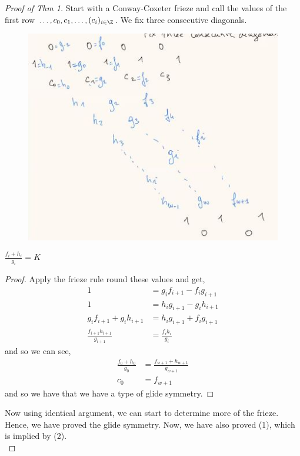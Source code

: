 \documentclass{article}
\begin{document}
\begin{proof}[Proof of Thm 1]
  Start with a Conway-Coxeter frieze and call the values of the first row $\dots, c_0, c_1, \dots, (c_i)_{i\in\Z}$. We fix three consecutive diagonals.
  \begin{figure}[!ht]
    \centering
    \includegraphics{./figures/L2.5}
  \end{figure}
  \newpage
  \begin{lemma}
    $\frac{f_i + h_i}{g_i} = K$
  \end{lemma}
  \begin{proof}
    Apply the frieze rule round these values and get,
    \begin{align*}
      1 &= g_i f_{i+1} - f_ig_{i+1}\\
      1  &= h_ig_{i+1} - g_ih_{i+1}\\
        g_if_{i+1} + g_ih_{i+1} &= h_ig_{i+1} + f_{i}g_{i+1}\\
        \frac{f_{i+1}h_{i+1}}{g_{i+1}} &= \frac{f_{i}h_{i}}{g_{i}}
    \end{align*}
    and so we can see,
    \begin{align*}
      \frac{f_0+h_0}{g_0} &= \frac{f_{w+1} + h_{w+1}}{g_{w+1}}\\
      c_0 &= f_{w+1}
    \end{align*}
    and so we have that we have a type of glide symmetry.
  \end{proof}
  Now using identical argument, we can start to determine more of the frieze. Hence, we have proved the glide symmetry. Now, we have also proved (1), which is implied by (2).\\


\end{proof}
\end{document}

